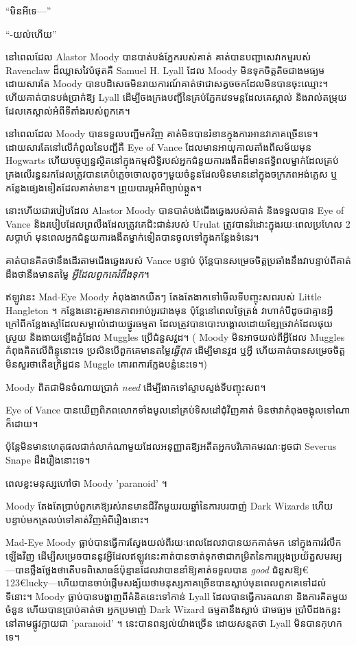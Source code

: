 {{{{{{“មិនអីទេ—”

“-យល់ហើយ”


នៅពេលដែល Alastor Moody បានបាត់បង់ភ្នែករបស់គាត់ គាត់បានបញ្ជាសេវាកម្មរបស់ Ravenclaw ដ៏ឈ្លាសវៃបំផុតគឺ Samuel H. Lyall ដែល Moody មិនទុកចិត្តតិចជាងមធ្យមដោយសារតែ Moody បានបដិសេធមិនរាយការណ៍គាត់ថាជាសត្វចចកដែលមិនបានចុះឈ្មោះ។ ហើយគាត់បានបង់ប្រាក់ឱ្យ Lyall ដើម្បីចងក្រងបញ្ជីនៃគ្រប់ភ្នែកវេទមន្តដែលគេស្គាល់ និងរាល់តម្រុយដែលគេស្គាល់អំពីទីតាំងរបស់ពួកគេ។

នៅពេលដែល Moody បានទទួលបញ្ជីមកវិញ គាត់មិនបានរំខានក្នុងការអានវាភាគច្រើនទេ។ ដោយសារតែនៅលើកំពូលនៃបញ្ជីគឺ Eye of Vance ដែលមានអាយុកាលតាំងពីសម័យមុន Hogwarts ហើយបច្ចុប្បន្នស្ថិតនៅក្នុងកម្មសិទ្ធិរបស់អ្នកជំនួយការងងឹតដ៏មានឥទ្ធិពលម្នាក់ដែលគ្រប់គ្រងលើរន្ធនរកដែលត្រូវបានគេបំភ្លេចចោលតូចៗមួយចំនួនដែលមិនមាននៅក្នុងចក្រភពអង់គ្លេស ឬកន្លែងផ្សេងទៀតដែលគាត់មាន។ ព្រួយបារម្ភអំពីច្បាប់ឆ្កួត។

នោះហើយជារបៀបដែល Alastor Moody បានបាត់បង់ជើងឆ្វេងរបស់គាត់ និងទទួលបាន Eye of Vance និងរបៀបដែលព្រលឹងដែលត្រូវគេជិះជាន់របស់ Urulat ត្រូវបានរំដោះក្នុងរយៈពេលប្រហែល 2 សប្តាហ៍ មុនពេលអ្នកជំនួយការងងឹតម្នាក់ទៀតបានចូលទៅក្នុងកន្លែងទំនេរ។

គាត់​បាន​គិត​ថា​នឹង​ដើរ​តាម​ជើង​ឆ្វេង​របស់ Vance បន្ទាប់ ប៉ុន្តែ​បាន​សម្រេច​ចិត្ត​ប្រឆាំង​នឹង​វា​បន្ទាប់​ពី​គាត់​ដឹង​ថា​នឹង​មាន​តម្លៃ \emph{អ្វី​ដែល​ពួក​គេ​រំពឹង​ទុក}។

ឥឡូវនេះ Mad-Eye Moody កំពុងងាកយឺតៗ តែងតែងាកទៅមើលទីបញ្ចុះសពរបស់ Little Hangleton ។ កន្លែងនោះគួរមានភាពអាប់អួរជាងមុន ប៉ុន្តែនៅពេលថ្ងៃត្រង់ វាហាក់បីដូចជាគ្មានអ្វីក្រៅពីកន្លែងស្មៅដែលសម្គាល់ដោយផ្នូរធម្មតា ដែលត្រូវបានបោះបង្គោលដោយខ្សែច្រវាក់ដែលផុយស្រួយ និងងាយឡើងភ្នំដែល Muggles ប្រើជំនួសវួដ។ ( Moody មិនអាចយល់ពីអ្វីដែល Muggles កំពុងគិតលើពិន្ទុនោះទេ ប្រសិនបើពួកគេមានតម្លៃ\emph{ធ្វើពុត} ដើម្បីមានវួដ ឬអ្វី ហើយគាត់បានសម្រេចចិត្តមិនសួរថាតើឧក្រិដ្ឋជន Muggle គោរពការក្លែងបន្លំនេះទេ។)

Moody ពិត​ជា​មិន​ចំណាយ​ប្រាក់ \emph{need} ដើម្បី​ងាក​ទៅ​ស្ទាបស្ទង់​ទីបញ្ចុះសព។

Eye of Vance បានឃើញពិភពលោកទាំងមូលនៅគ្រប់ទិសដៅជុំវិញគាត់ មិនថាវាកំពុងចង្អុលទៅណាក៏ដោយ។

ប៉ុន្តែមិនមានហេតុផលជាក់លាក់ណាមួយដែលអនុញ្ញាតឱ្យអតីតអ្នកបរិភោគមរណៈដូចជា Severus Snape ដឹងរឿងនោះទេ។

ពេលខ្លះមនុស្សហៅថា Moody 'paranoid' ។

Moody តែងតែប្រាប់ពួកគេឱ្យរស់រានមានជីវិតមួយរយឆ្នាំនៃការបរបាញ់ Dark Wizards ហើយបន្ទាប់មកត្រលប់ទៅគាត់វិញអំពីរឿងនោះ។

Mad-Eye Moody ធ្លាប់បានធ្វើការស្វែងយល់ពីរយៈពេលដែលវាបានយកគាត់មក នៅក្នុងការរំលឹកឡើងវិញ ដើម្បីសម្រេចបាននូវអ្វីដែលឥឡូវនេះគាត់បានចាត់ទុកថាជាកម្រិតនៃការប្រុងប្រយ័ត្នសមរម្យ—បានថ្លឹងថ្លែងថាតើបទពិសោធន៍ប៉ុន្មានដែលវាបាននាំឱ្យគាត់ទទួលបាន \emph{good} ជំនួសឱ្យ€ 123€{lucky}—ហើយបានចាប់ផ្តើមសង្ស័យថាមនុស្សភាគច្រើនបានស្លាប់មុនពេលពួកគេទៅដល់ទីនោះ។ Moody ធ្លាប់បានបង្ហាញពីគំនិតនេះទៅកាន់ Lyall ដែលបានធ្វើការគណនា និងការគិតមួយចំនួន ហើយបានប្រាប់គាត់ថា អ្នកប្រមាញ់ Dark Wizard ធម្មតានឹងស្លាប់ ជាមធ្យម ប្រាំបីដងកន្លះនៅតាមផ្លូវក្លាយជា 'paranoid' ។ នេះបានពន្យល់យ៉ាងច្រើន ដោយសន្មតថា Lyall មិនបានកុហកទេ។

}}}}}}
